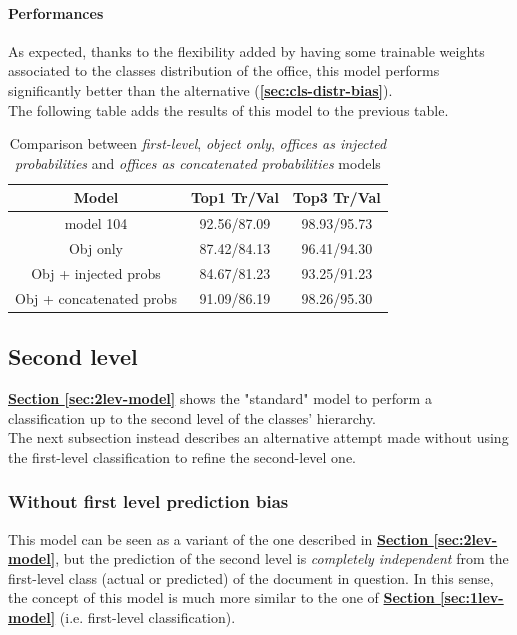 \documentclass[12pt]{article}
\begin{document}
\paragraph{Performances}
As expected, thanks to the flexibility added by having some trainable weights associated to the classes distribution of the office, this model performs significantly better than the alternative (\textbf{\ref{sec:cls-distr-bias}}).\\
The following table adds the results of this model to the previous table.
\begin{table}[ht!]
    \begin{adjustwidth}{}{}
	    \centering
	    \small
	    \begin{tabular}{ |c|c|c| }
        \hline
        \textbf{Model} & \textbf{Top1 Tr/Val} & \textbf{Top3 Tr/Val}\\
        \hline
        model 104 & 92.56/87.09 & 98.93/95.73 \\
        Obj only & 87.42/84.13 & 96.41/94.30 \\
        Obj + injected probs & 84.67/81.23 & 93.25/91.23 \\
        Obj + concatenated probs & 91.09/86.19 & 98.26/95.30 \\
        \hline
        \end{tabular}
	    \label{tb:relevant-bias-concat}
    \end{adjustwidth}
    \captionsetup{justification   = centering}
    \caption{Comparison between \textit{first-level}, \textit{object only}, \textit{offices as injected probabilities} and \textit{offices as concatenated probabilities} models}
\end{table}
\subsection{Second level}\label{sec:altern-lev2}
\hyperref[sec:2lev-model]{\textbf{Section \ref{sec:2lev-model}}} shows the "standard" model to perform a classification up to the second level of the classes' hierarchy.\\
The next subsection instead describes an alternative attempt made without using the first-level classification to refine the second-level one.

\subsubsection{Without first level prediction bias}\label{sec:altern-no-1cls-bias}
This model can be seen as a variant of the one described in \hyperref[sec:2lev-model]{\textbf{Section \ref{sec:2lev-model}}}, but the prediction of the second level is \textit{completely independent} from the first-level class (actual or predicted) of the document in question.
In this sense, the concept of this model is much more similar to the one of \hyperref[sec:1lev-model]{\textbf{Section \ref{sec:1lev-model}}} (i.e. first-level classification).
\end{document}
